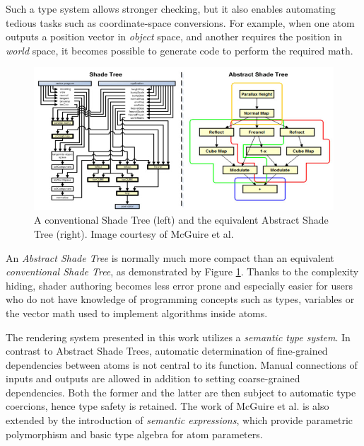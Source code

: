 Such a type system allows stronger checking, but it also enables automating tedious tasks such as coordinate-space conversions. For example, when one atom outputs a position vector in \emph{object} space, and another requires the position in \emph{world} space, it becomes possible to generate code to perform the required math.

\begin{figure}[h!]
  \centering
    \includegraphics[width=0.9\linewidth]{./Chapters/AbstractShadeTree.jpg}
    \caption[Abstract Shade Tree]{A conventional Shade Tree (left) and the equivalent Abstract Shade Tree (right). Image courtesy of McGuire et al.}
  \label{fig:AbstractShadeTree}
\end{figure}

An \emph{Abstract Shade Tree} is normally much more compact than an equivalent \emph{conventional Shade Tree}, as demonstrated by Figure \ref{fig:AbstractShadeTree}. Thanks to the complexity hiding, shader authoring becomes less error prone and especially easier for users who do not have knowledge of programming concepts such as types, variables or the vector math used to implement algorithms inside atoms.
 
The rendering system presented in this work utilizes a \emph{semantic type system}. In contrast to Abstract Shade Trees, automatic determination of fine-grained dependencies between atoms is not central to its function. Manual connections of inputs and outputs are allowed in addition to setting coarse-grained dependencies. Both the former and the latter are then subject to automatic type coercions, hence type safety is retained. The work of McGuire et al. is also extended by the introduction of \emph{semantic expressions}, which provide parametric polymorphism and basic type algebra for atom parameters.
